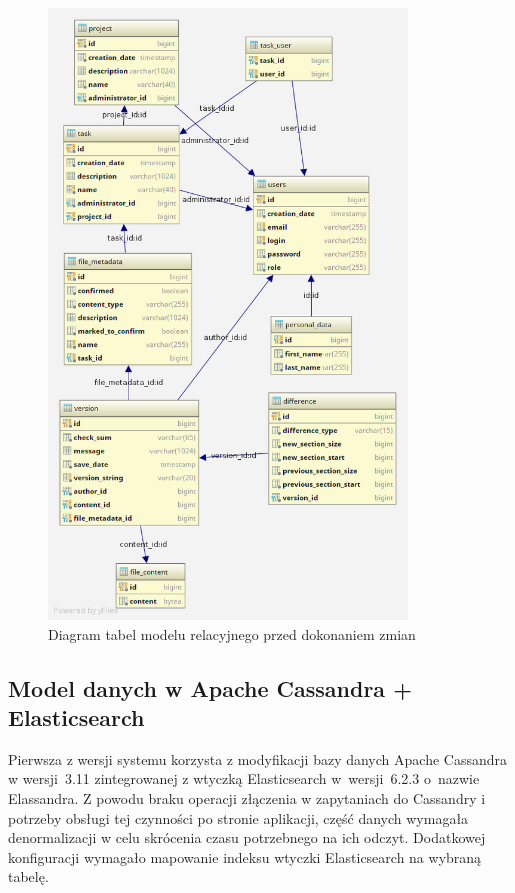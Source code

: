 \begin{figure}[!ht]
\centering
\includegraphics[width=0.85\textwidth]{figures/diagram_przed.png}
\caption{Diagram tabel modelu relacyjnego przed dokonaniem zmian}
\label{fig:ModelPrzed}
\end{figure}

\subsection{Model danych w Apache Cassandra + Elasticsearch} \label{sec:ModelDanychCassandra}

Pierwsza z wersji systemu korzysta z modyfikacji bazy danych Apache Cassandra w wersji~3.11 zintegrowanej z wtyczką Elasticsearch w~wersji~6.2.3 o~nazwie Elassandra.
Z powodu braku operacji złączenia w zapytaniach do Cassandry i potrzeby obsługi tej czynności po stronie aplikacji, część danych wymagała denormalizacji w celu skrócenia czasu potrzebnego na ich odczyt.
Dodatkowej konfiguracji wymagało mapowanie indeksu wtyczki Elasticsearch na wybraną tabelę.

